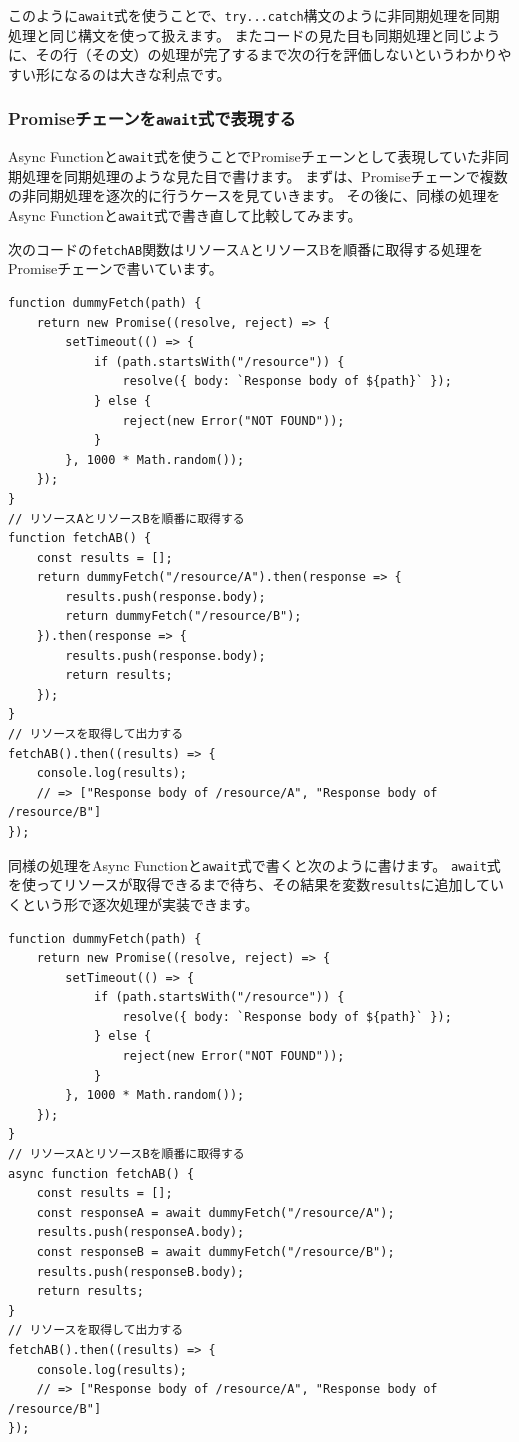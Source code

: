 このように\texttt{await}式を使うことで、\texttt{try...catch}構文のように非同期処理を同期処理と同じ構文を使って扱えます。
またコードの見た目も同期処理と同じように、その行（その文）の処理が完了するまで次の行を評価しないというわかりやすい形になるのは大きな利点です。

\hypertarget{promise-chain-to-async-function}{%
\subsubsection{\texorpdfstring{Promiseチェーンを\texttt{await}式で表現する}{Promiseチェーンをawait式で表現する}}\label{promise-chain-to-async-function}}

Async
Functionと\texttt{await}式を使うことでPromiseチェーンとして表現していた非同期処理を同期処理のような見た目で書けます。
まずは、Promiseチェーンで複数の非同期処理を逐次的に行うケースを見ていきます。
その後に、同様の処理をAsync
Functionと\texttt{await}式で書き直して比較してみます。

次のコードの\texttt{fetchAB}関数はリソースAとリソースBを順番に取得する処理をPromiseチェーンで書いています。

\begin{lstlisting}
function dummyFetch(path) {
    return new Promise((resolve, reject) => {
        setTimeout(() => {
            if (path.startsWith("/resource")) {
                resolve({ body: `Response body of ${path}` });
            } else {
                reject(new Error("NOT FOUND"));
            }
        }, 1000 * Math.random());
    });
}
// リソースAとリソースBを順番に取得する
function fetchAB() {
    const results = [];
    return dummyFetch("/resource/A").then(response => {
        results.push(response.body);
        return dummyFetch("/resource/B");
    }).then(response => {
        results.push(response.body);
        return results;
    });
}
// リソースを取得して出力する
fetchAB().then((results) => {
    console.log(results); 
    // => ["Response body of /resource/A", "Response body of /resource/B"]
});
\end{lstlisting}

同様の処理をAsync
Functionと\texttt{await}式で書くと次のように書けます。
\texttt{await}式を使ってリソースが取得できるまで待ち、その結果を変数\texttt{results}に追加していくという形で逐次処理が実装できます。

\begin{lstlisting}
function dummyFetch(path) {
    return new Promise((resolve, reject) => {
        setTimeout(() => {
            if (path.startsWith("/resource")) {
                resolve({ body: `Response body of ${path}` });
            } else {
                reject(new Error("NOT FOUND"));
            }
        }, 1000 * Math.random());
    });
}
// リソースAとリソースBを順番に取得する
async function fetchAB() {
    const results = [];
    const responseA = await dummyFetch("/resource/A");
    results.push(responseA.body);
    const responseB = await dummyFetch("/resource/B");
    results.push(responseB.body);
    return results;
}
// リソースを取得して出力する
fetchAB().then((results) => {
    console.log(results); 
    // => ["Response body of /resource/A", "Response body of /resource/B"]
});
\end{lstlisting}

